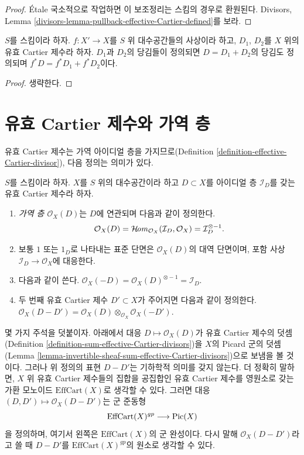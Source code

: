 \begin{proof}
\'Etale 국소적으로 작업하면 이 보조정리는 스킴의 경우로 환원된다.
Divisors, Lemma
\ref{divisors-lemma-pullback-effective-Cartier-defined}를 보라.
\end{proof}

\begin{lemma}
\label{lemma-pullback-effective-Cartier-divisors-additive}
$S$를 스킴이라 하자. $f : X' \to X$를 $S$ 위 대수공간들의 사상이라 하고,
$D_1$, $D_2$를 $X$ 위의 유효 Cartier 제수라 하자. $D_1$과 $D_2$의
당김들이 정의되면 $D = D_1 + D_2$의 당김도 정의되며
$f^*D = f^*D_1 + f^*D_2$이다.
\end{lemma}

\begin{proof}
생략한다.
\end{proof}

\section{유효 Cartier 제수와 가역 층}
\label{section-effective-Cartier-invertible}

\noindent
유효 Cartier 제수는 가역 아이디얼 층을 가지므로(Definition
\ref{definition-effective-Cartier-divisor}), 다음 정의는 의미가 있다.

\begin{definition}
\label{definition-invertible-sheaf-effective-Cartier-divisor}
$S$를 스킴이라 하자. $X$를 $S$ 위의 대수공간이라 하고
$D \subset X$를 아이디얼 층 $\mathcal{I}_D$를 갖는 유효 Cartier 제수라 하자.
\begin{enumerate}
\item {\it 가역 층 $\mathcal{O}_X(D)$}는 $D$에 연관되며 다음과 같이 정의한다.
$$
\mathcal{O}_X(D) =
\mathop{\mathcal{H}\!\mathit{om}}\nolimits_{\mathcal{O}_X}(\mathcal{I}_D, \mathcal{O}_X) =
\mathcal{I}_D^{\otimes -1}.
$$
\item 보통 $1$ 또는 $1_D$로 나타내는 표준 단면은 $\mathcal{O}_X(D)$의
대역 단면이며, 포함 사상 $\mathcal{I}_D \to \mathcal{O}_X$에 대응한다.
\item 다음과 같이 쓴다.
$\mathcal{O}_X(-D) = \mathcal{O}_X(D)^{\otimes -1} = \mathcal{I}_D$.
\item 두 번째 유효 Cartier 제수 $D' \subset X$가 주어지면 다음과 같이
정의한다.
$\mathcal{O}_X(D - D') =
\mathcal{O}_X(D) \otimes_{\mathcal{O}_X} \mathcal{O}_X(-D')$.
\end{enumerate}
\end{definition}

\noindent
몇 가지 주석을 덧붙이자. 아래에서 대응
$D \mapsto \mathcal{O}_X(D)$가 유효 Cartier 제수의 덧셈(Definition
\ref{definition-sum-effective-Cartier-divisors})을 $X$의 Picard 군의
덧셈(Lemma
\ref{lemma-invertible-sheaf-sum-effective-Cartier-divisors})으로 보냄을 볼
것이다. 그러나 위 정의의 표현 $D - D'$는 기하학적 의미를 갖지 않는다.
더 정확히 말하면, $X$ 위 유효 Cartier 제수들의 집합을 공집합인 유효
Cartier 제수를 영원소로 갖는 가환 모노이드 $\text{EffCart}(X)$로 생각할
수 있다. 그러면 대응
$(D, D') \mapsto \mathcal{O}_X(D - D')$는 군 준동형
$$
\text{EffCart}(X)^{gp} \longrightarrow \mathop{\mathrm{Pic}}\nolimits(X)
$$
을 정의하며, 여기서 왼쪽은 $\text{EffCart}(X)$의 군 완성이다. 다시 말해
$\mathcal{O}_X(D - D')$라고 쓸 때 $D - D'$를
$\text{EffCart}(X)^{gp}$의 원소로 생각할 수 있다.

